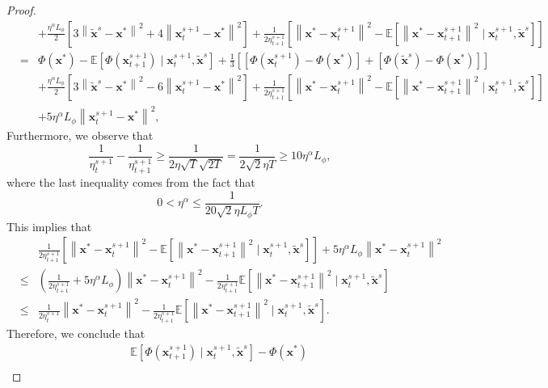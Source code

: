 \documentclass[11pt]{article}
\newcommand{\BE}{\mathbb{E}}
\newcommand{\x}{\mathbf x}
\begin{document}
\begin{proof}
\begin{eqnarray*}
& & + \frac{\eta^{\alpha} L_\phi}{2} \left[3\left\|\tilde{\x}^s - \x^*\right\|^2 + 4\left\| \x_t^{s+1} - \x^*\right\|^2 \right] + \frac{1}{2\eta_{t+1}^{s+1}}\left[ \left\| \x^* - \x_t^{s+1} \right\|^2 - \BE\left[\left\| \x^* - \x_{t+1}^{s+1} \right\|^2 \mid \x_t^{s+1}, \tilde{\x}^s \right] \right] \\
& = & \Phi(\x^*) - \BE\left[\Phi(\x_{t+1}^{s+1}) \mid \x_t^{s+1}, \tilde{\x}^s \right] + \frac{1}{3} \left[ \left[\Phi(\x_t^{s+1}) - \Phi(\x^*) \right] + \left[ \Phi(\tilde{\x}^s) - \Phi(\x^*) \right] \right] \\
& & + \frac{\eta^{\alpha} L_\phi}{2} \left[3\left\|\tilde{\x}^s - \x^*\right\|^2 - 6\left\| \x_t^{s+1} - \x^*\right\|^2 \right] + \frac{1}{2\eta_{t+1}^{s+1}}\left[ \left\| \x^* - \x_t^{s+1} \right\|^2 - \BE\left[\left\| \x^* - \x_{t+1}^{s+1} \right\|^2 \mid \x_t^{s+1}, \tilde{\x}^s \right] \right] \\
& & + 5\eta^{\alpha} L_\phi \left\| \x_t^{s+1} - \x^*\right\|^2, 
\end{eqnarray*} 
Furthermore, we observe that 
\begin{equation*}
\frac{1}{\eta_t^{s+1}} - \frac{1}{\eta_{t+1}^{s+1}} \geq \frac{1}{2\eta\sqrt{T}\sqrt{2T}} = \frac{1}{2\sqrt{2}\eta T} \geq 10\eta^{\alpha} L_\phi, 
\end{equation*}
where the last inequality comes from the fact that 
\begin{equation*}
0 < \eta^{\alpha} \leq \frac{1}{20\sqrt{2}\eta L_\phi T}. 
\end{equation*} 
This implies that
\begin{eqnarray*}
& & \frac{1}{2\eta_{t+1}^{s+1}}\left[ \left\| \x^* - \x_t^{s+1} \right\|^2 - \BE\left[\left\| \x^* - \x_{t+1}^{s+1} \right\|^2 \mid \x_t^{s+1}, \tilde{\x}^s \right] \right] + 5\eta^{\alpha} L_\phi \left\| \x^* - \x_t^{s+1} \right\|^2 \\
& \leq & \left(\frac{1}{2\eta_{t+1}^{s+1}} + 5\eta^{\alpha} L_\phi \right) \left\| \x^* - \x_t^{s+1}\right\|^2  - \frac{1}{2\eta_{t+1}^{s+1}} \BE\left[\left\| \x^* - \x_{t+1}^{s+1} \right\|^2 \mid \x_t^{s+1}, \tilde{\x}^s \right] \\
& \leq & \frac{1}{2\eta_t^{s+1}} \left\| \x^* - \x_t^{s+1} \right\|^2 - \frac{1}{2\eta_{t+1}^{s+1}} \BE\left[\left\| \x^* - \x_{t+1}^{s+1} \right\|^2 \mid \x_t^{s+1}, \tilde{\x}^s \right]. 
\end{eqnarray*}
Therefore, we conclude that 
\begin{eqnarray*}
& & \BE\left[\Phi(\x_{t+1}^{s+1}) \mid \x_t^{s+1}, \tilde{\x}^s \right] - \Phi(\x^*) \\

\end{eqnarray*}
\end{proof}
\end{document}
